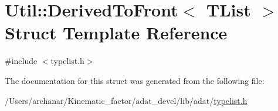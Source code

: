 \hypertarget{structUtil_1_1TL_1_1DerivedToFront}{}\section{Util\+:\+:Derived\+To\+Front$<$ T\+List $>$ Struct Template Reference}
\label{structUtil_1_1TL_1_1DerivedToFront}


{\ttfamily \#include $<$typelist.\+h$>$}



The documentation for this struct was generated from the following file\+:\begin{DoxyCompactItemize}
\item 
/\+Users/archanar/\+Kinematic\+\_\+factor/adat\+\_\+devel/lib/adat/\mbox{\hyperlink{lib_2adat_2typelist_8h}{typelist.\+h}}\end{DoxyCompactItemize}
